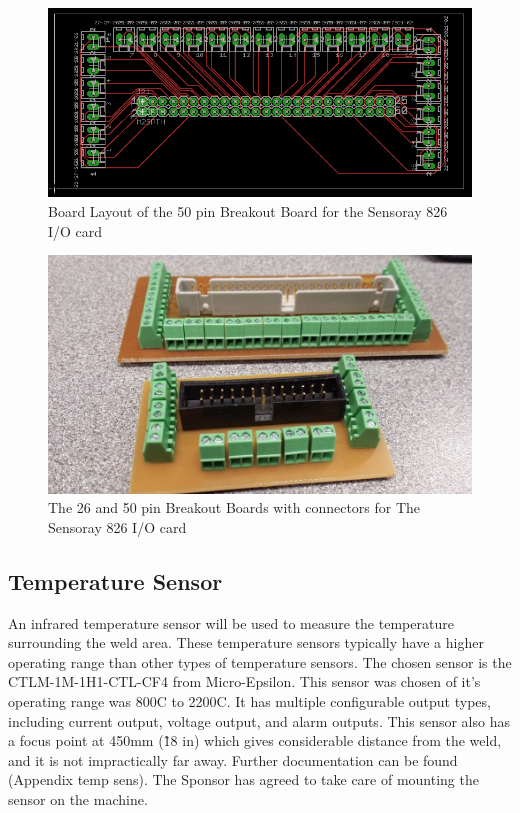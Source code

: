 \documentclass[12pt]{article}
\begin{document}
\begin{figure}[!h]
\centering
\includegraphics[scale=0.55]{50}
\caption{Board Layout of the 50 pin Breakout Board for the Sensoray 826 I/O card}
\end{figure}

\clearpage

\begin{figure}[!h]
\centering
\includegraphics[scale=0.5]{realbreaker}
\caption{The 26 and 50 pin Breakout Boards with connectors for The Sensoray 826 I/O card}
\end{figure}

\subsection{Temperature Sensor}

An infrared temperature sensor will be used to measure the temperature surrounding the weld area. These temperature sensors typically have a higher operating range than other types of temperature sensors. The chosen sensor is the CTLM-1M-1H1-CTL-CF4 from Micro-Epsilon. This sensor was chosen of it’s operating range was 800C to 2200C. It has multiple configurable output types, including current output, voltage output, and alarm outputs. This sensor also has a focus point at 450mm (\~18 in) which gives considerable distance from the weld, and it is not impractically far away. Further documentation can be found (Appendix temp sens). The Sponsor has agreed to take care of mounting the sensor on the machine.\\
\end{document}

